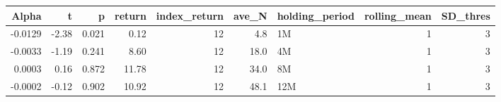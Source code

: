 \begin{table}[ht]
\centering
\begin{tabular}{rrrrrrlrr}
  \hline
Alpha & t & p & return & index\_return & ave\_N & holding\_period & rolling\_mean & SD\_thres \\ 
  \hline
-0.0129 & -2.38 & 0.021 & 0.12 & 12 & 4.8 & 1M &  1 &  3 \\ 
  -0.0033 & -1.19 & 0.241 & 8.60 & 12 & 18.0 & 4M &  1 &  3 \\ 
  0.0003 & 0.16 & 0.872 & 11.78 & 12 & 34.0 & 8M &  1 &  3 \\ 
  -0.0002 & -0.12 & 0.902 & 10.92 & 12 & 48.1 & 12M &  1 &  3 \\ 
   \hline
\end{tabular}
\end{table}

